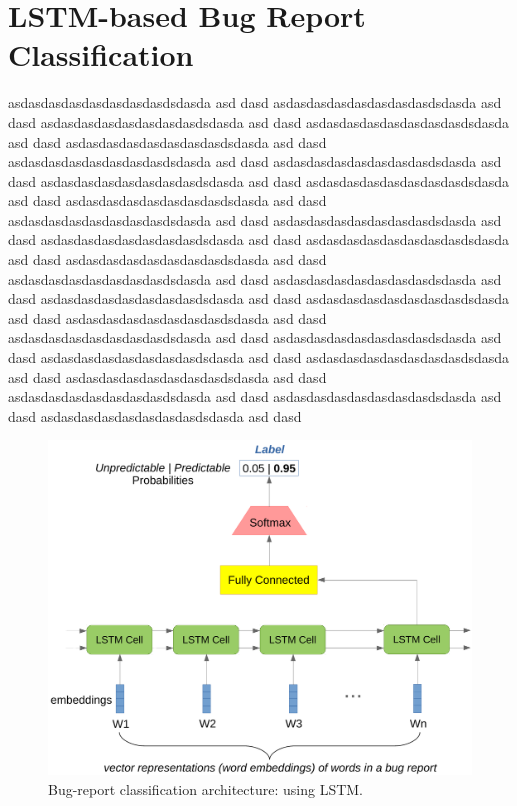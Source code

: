 \section{LSTM-based Bug Report Classification}
\label{sec:lstm-based classification}
asdasdasdasdasdasdasdasdsdasda asd dasd asdasdasdasdasdasdasdasdsdasda asd dasd asdasdasdasdasdasdasdasdsdasda asd dasd asdasdasdasdasdasdasdasdsdasda asd dasd asdasdasdasdasdasdasdasdsdasda asd dasd asdasdasdasdasdasdasdasdsdasda asd dasd asdasdasdasdasdasdasdasdsdasda asd dasd asdasdasdasdasdasdasdasdsdasda asd dasd asdasdasdasdasdasdasdasdsdasda asd dasd asdasdasdasdasdasdasdasdsdasda asd dasd asdasdasdasdasdasdasdasdsdasda asd dasd asdasdasdasdasdasdasdasdsdasda asd dasd asdasdasdasdasdasdasdasdsdasda asd dasd asdasdasdasdasdasdasdasdsdasda asd dasd asdasdasdasdasdasdasdasdsdasda asd dasd asdasdasdasdasdasdasdasdsdasda asd dasd asdasdasdasdasdasdasdasdsdasda asd dasd asdasdasdasdasdasdasdasdsdasda asd dasd asdasdasdasdasdasdasdasdsdasda asd dasd asdasdasdasdasdasdasdasdsdasda asd dasd asdasdasdasdasdasdasdasdsdasda asd dasd asdasdasdasdasdasdasdasdsdasda asd dasd asdasdasdasdasdasdasdasdsdasda asd dasd asdasdasdasdasdasdasdasdsdasda asd dasd asdasdasdasdasdasdasdasdsdasda asd dasd asdasdasdasdasdasdasdasdsdasda asd dasd asdasdasdasdasdasdasdasdsdasda asd dasd asdasdasdasdasdasdasdasdsdasda asd dasd 
\begin{figure}[t]
\centering
\includegraphics[width=\columnwidth]{figures/lstm.pdf}
\caption{Bug-report classification architecture: using LSTM.}
\label{fig:lstm}
\end{figure}

